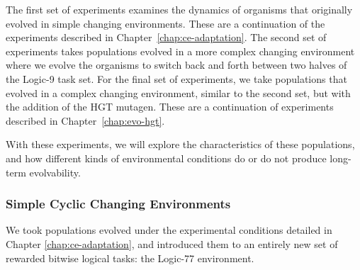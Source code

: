 \documentclass[PhD]{msu-thesis}
\begin{document}
The first set of experiments examines the dynamics of organisms
that originally evolved in simple changing environments. These are a continuation of the experiments described in Chapter~\ref{chap:ce-adaptation}. The second set of experiments takes populations evolved in a more complex changing environment where we evolve the organisms to switch back and forth between two halves of the Logic-9 task set. For the final set of experiments, we take populations that evolved in a complex changing environment, similar to the second set, but with the addition of the HGT mutagen. These are a continuation of experiments described in Chapter~\ref{chap:evo-hgt}.

With these experiments, we will explore the characteristics of these populations, and how different kinds of environmental conditions do or do not produce long-term evolvability.  

\subsubsection{Simple Cyclic Changing Environments}
We took populations evolved under the experimental conditions detailed in Chapter \ref{chap:ce-adaptation}, and introduced them to an entirely new set of rewarded bitwise logical tasks: the Logic-77 environment. 

\end{document}
